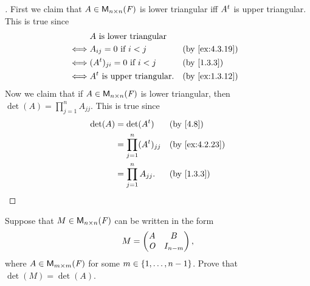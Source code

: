\begin{proof}[]
	First we claim that \(A \in \mathsf{M}_{{n} \times n}({\mathit{F}})\) is lower triangular iff \({A}^{t}\) is upper triangular.
	This is true since
	\begin{align*}
		     & A \text{ is lower triangular}                            \\
		\iff & A_{i j} = 0 \text{ if } i < j        &  & \by{ex:4.3.19} \\
		\iff & (\tp{A})_{j i} = 0 \text{ if } i < j &  & \by{1.3.3}     \\
		\iff & \tp{A} \text{ is upper triangular}.  &  & \by{ex:1.3.12}
	\end{align*}
	Now we claim that if \(A \in \mathsf{M}_{{n} \times n}({\mathit{F}})\) is lower triangular, then \(\det(A) = \prod_{j = 1}^n A_{j j}\).
	This is true since
	\begin{align*}
		\det(A) & = \det(\tp{A})                   &  & \by{4.8}       \\
		        & = \prod_{j = 1}^n (\tp{A})_{j j} &  & \by{ex:4.2.23} \\
		        & = \prod_{j = 1}^n A_{j j}.       &  & \by{1.3.3}
	\end{align*}
\end{proof}

\begin{ex}\label{ex:4.3.20}
	Suppose that \(M \in \mathsf{M}_{{n} \times n}({\mathit{F}})\) can be written in the form
	\[
		M = \begin{pmatrix}
			A   & B         \\
			\mathit{O} & I_{n - m}
		\end{pmatrix},
	\]
	where \(A \in \mathsf{M}_{{m} \times m}({\mathit{F}})\) for some \(m \in \left\lbrace1, \dots, n - 1\right\rbrace\).
	Prove that \(\det(M) = \det(A)\).
\end{ex}


